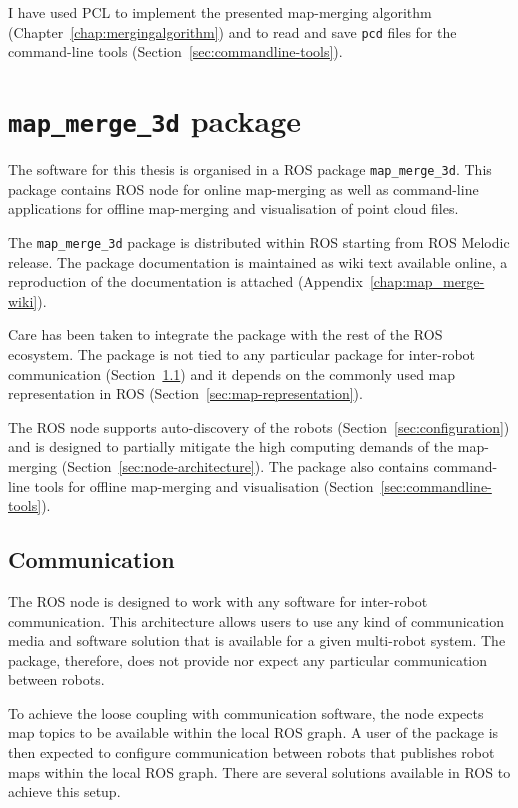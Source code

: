 I have used \gls{PCL} to implement the presented map-merging algorithm (Chapter~\ref{chap:mergingalgorithm}) and to read and save \texttt{pcd} files for the command-line tools (Section~\ref{sec:commandline-tools}).


\section{\texttt{map\_merge\_3d} package}
\label{sec:ros-package}

The software for this thesis is organised in a \gls{ROS} package \texttt{map\_merge\_3d}. This package contains \gls{ROS} node for online map-merging as well as command-line applications for offline map-merging and visualisation of point cloud files.

The \texttt{map\_merge\_3d} package is distributed within \gls{ROS} starting from \gls{ROS} Melodic release. The package documentation is maintained as wiki text available online, a reproduction of the documentation is attached (Appendix~\ref{chap:map_merge-wiki}).

Care has been taken to integrate the package with the rest of the \gls{ROS} ecosystem. The package is not tied to any particular package for inter-robot communication (Section~\ref{sec:communication}) and it depends on the commonly used map representation in \gls{ROS} (Section~\ref{sec:map-representation}).

The \gls{ROS} node supports auto-discovery of the robots (Section~\ref{sec:configuration}) and is designed to partially mitigate the high computing demands of the map-merging (Section~\ref{sec:node-architecture}). The package also contains command-line tools for offline map-merging and visualisation (Section~\ref{sec:commandline-tools}).

\subsection{Communication}
\label{sec:communication}

The \gls{ROS} node is designed to work with any software for inter-robot communication. This architecture allows users to use any kind of communication media and software solution that is available for a given multi-robot system. The package, therefore, does not provide nor expect any particular communication between robots.

To achieve the loose coupling with communication software, the node expects map topics to be available within the local \gls{ROS} graph. A user of the package is then expected to configure communication between robots that publishes robot maps within the local \gls{ROS} graph. There are several solutions available in \gls{ROS} to achieve this setup.

